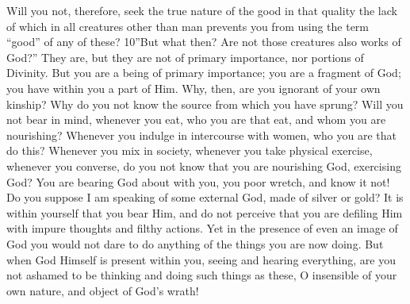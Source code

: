 Will you not, therefore, seek the true nature of the good in that quality the lack of which in all creatures other than man prevents you from using the term ``good'' of any of these? 10''But what then? Are not those creatures also works of God?'' They are, but they are not of primary importance, nor portions of Divinity. But you are a being of primary importance; you are a fragment of God; you have within you a part of Him. Why, then, are you ignorant of your own kinship? Why do you not know the source from which you have sprung? Will you not bear in mind, whenever you eat, who you are that eat, and whom you are nourishing? Whenever you indulge in intercourse with women, who you are that do this? Whenever you mix in society, whenever you take physical exercise, whenever you converse, do you not know that you are nourishing God, exercising God? You are bearing God about with you, you poor wretch, and know it not! Do you suppose I am speaking of some external God, made of silver or gold? It is within yourself that you bear Him, and do not perceive that you are defiling Him with impure thoughts and filthy actions. Yet in the presence of even an image of God you would not dare to do anything of the things you are now doing. But when God Himself is present within you, seeing and hearing everything, are you not ashamed to be thinking and doing such things as these, O insensible of your own nature, and object of God's wrath!

